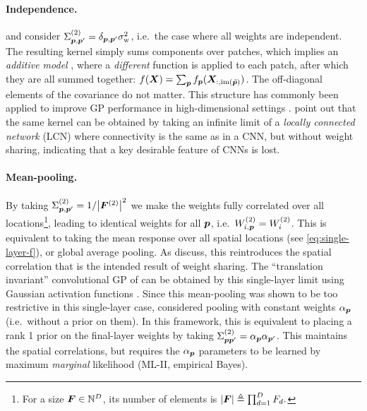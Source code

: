 \documentclass[accepted]{uai2021} %
\newcommand{\layerWs}[1]{W^{(#1)}}
\newcommand{\layersizebase}{\vF}
\newcommand{\layersizebases}{F}
\newcommand{\layersize}[1]{{\layersizebase^{\bra{#1}}}}
\newcommand{\convpatch}[1]{{\text{im}\bra{\tilde#1}}}
\newcommand{\priorWcovs}[1]{\Sigma^{(#1)}}
\newcommand{\chan}{i}
\newcommand{\patch}{\vp}               %
\newcommand{\sigmaw}{{\sigma^{2}_{\text{w}}}}
\newcommand{\0}{\boldsymbol{0}}
\newcommand{\1}{\boldsymbol{1}}
\begin{document}
\paragraph{Independence.}  and \citet{novak2019infiniteconv} consider $\priorWcovs{2}_{\patch,\patch'} = \delta_{\patch,\patch'}\sigmaw$,
i.e.~the case where all weights are independent. The resulting kernel simply sums components over patches, which implies an \emph{additive model} \citep{stone1985}, where a \emph{different} function is applied to each patch, after which they are all summed together: $f(\vX) = \sum_\patch f_\patch(\vX_{:,\convpatch{\patch}})$.
The off-diagonal elements of the covariance do not matter.
This structure has commonly been applied to improve GP performance in high-dimensional settings \citep[e.g.][]{duvenaud2011additive,durrande2012additive}. \citet{novak2019infiniteconv} point out that the same kernel can be obtained by taking an infinite limit of a \emph{locally connected network} (LCN) \citep{lecun1989generalization} where connectivity is the same as in a CNN, but without weight sharing, indicating that a key desirable feature of CNNs is lost.

\paragraph{Mean-pooling.} By taking $\priorWcovs{2}_{\patch,\patch'} = 1/\abs{\layersize{2}}^{2}$ we make the weights fully correlated over all locations\footnote{For a size $\layersizebase \in \sN^{D}$, its number of elements is $\abs{\layersizebase} \eqdef \prod_{d=1}^{D}\layersizebases_{d}.$}, leading to identical weights for all $\patch$, i.e.~$\layerWs{2}_{\chan,\patch} = \layerWs{2}_{\chan}$. This is equivalent to taking the mean response over all spatial locations (see \cref{eq:single-layer-f}), or global average pooling. As \citet{novak2019infiniteconv} discuss, this reintroduces the spatial correlation that is the intended result of weight sharing. The ``translation invariant'' convolutional GP
of \citet{vdw2017convgp} can be obtained by this single-layer limit using Gaussian activation functions \citep{vdw2019thesis}. Since this mean-pooling was shown to be too restrictive in this single-layer case,  considered pooling with constant weights $\alpha_\patch$ (i.e.~without a prior on them). In this framework, this is equivalent to placing a rank 1 prior on the final-layer weights by taking $\priorWcovs{2}_{\patch\patch'} = \alpha_\patch \alpha_{\patch'}$. This maintains the spatial correlations, but requires the $\alpha_\patch$ parameters to be learned by maximum \textit{marginal} likelihood (ML-II, empirical Bayes).
\end{document}
